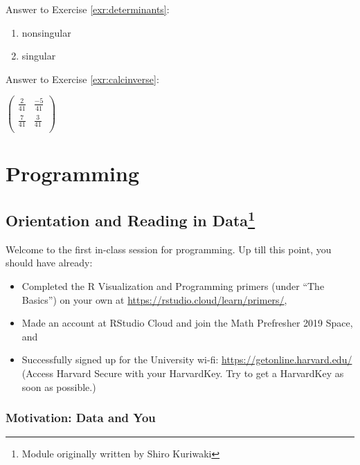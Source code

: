 \documentclass[
]{book}
\providecommand{\tightlist}{%
  \setlength{\itemsep}{0pt}\setlength{\parskip}{0pt}}
\theoremstyle{definition}
\theoremstyle{definition}
\theoremstyle{definition}
\theoremstyle{remark}
\begin{document}
Answer to Exercise \ref{exr:determinants}:

\begin{enumerate}
\def\labelenumi{\arabic{enumi}.}
\item
  nonsingular
\item
  singular
\end{enumerate}

Answer to Exercise \ref{exr:calcinverse}:

\(\begin{pmatrix}  \frac{2}{41} & \frac{-5}{41}\\  \frac{7}{41} & \frac{3}{41}\\  \end{pmatrix}\)

\hypertarget{part-programming}{%
\part{Programming}\label{part-programming}}

\hypertarget{dataimport}{%
\chapter[Orientation and Reading in Data]{\texorpdfstring{Orientation and Reading in Data\footnote{Module originally written by Shiro Kuriwaki}}{Orientation and Reading in Data}}\label{dataimport}}

Welcome to the first in-class session for programming. Up till this point, you should have already:

\begin{itemize}
\tightlist
\item
  Completed the R Visualization and Programming primers (under ``The Basics'') on your own at \url{https://rstudio.cloud/learn/primers/},
\item
  Made an account at RStudio Cloud and join the Math Prefresher 2019 Space, and
\item
  Successfully signed up for the University wi-fi: \url{https://getonline.harvard.edu/} (Access Harvard Secure with your HarvardKey. Try to get a HarvardKey as soon as possible.)
\end{itemize}

\hypertarget{motivation-data-and-you}{%
\section*{Motivation: Data and You}\label{motivation-data-and-you}}
\end{document}
